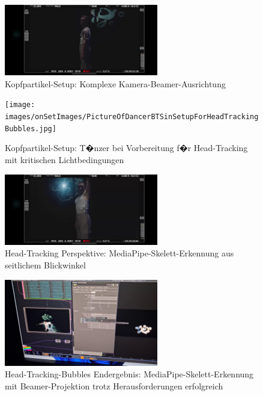 \begin{figure}[!htbp]
   \centering
   \includegraphics[width=0.6\textwidth,height=0.25\textheight,keepaspectratio]{images/HeadTracking_HQCamera.png}
   \caption{Kopfpartikel-Setup: Komplexe Kamera-Beamer-Ausrichtung}
   \label{fig:head_setup}
\end{figure}

\begin{figure}[!htbp]
   \centering
   \texttt{[image: images/onSetImages/PictureOfDancerBTSinSetupForHeadTrackingBubbles.jpg]}
   \caption{Kopfpartikel-Setup: T�nzer bei Vorbereitung f�r Head-Tracking mit kritischen Lichtbedingungen}
   \label{fig:dancer_head_tracking}
\end{figure}

\begin{figure}[!htbp]
   \centering
   \includegraphics[width=0.6\textwidth,height=0.25\textheight,keepaspectratio]{images/HeadTrackingLeftSideOfHeadWithHeadClearlyAttached.png}
   \caption{Head-Tracking Perspektive: MediaPipe-Skelett-Erkennung aus seitlichem Blickwinkel}
   \label{fig:low_light_tracking}
\end{figure}

\begin{figure}[!htbp]
   \centering
   \includegraphics[width=0.6\textwidth,height=0.25\textheight,keepaspectratio]{images/HeadtrackingBubblesClearlyAtHeadLevelOnBackgroundBeamerMediaPipeSkeletonBeautifullyVisible.png}
   \caption{Head-Tracking-Bubbles Endergebnis: MediaPipe-Skelett-Erkennung mit Beamer-Projektion trotz Herausforderungen erfolgreich}
   \label{fig:head_result}
\end{figure}

